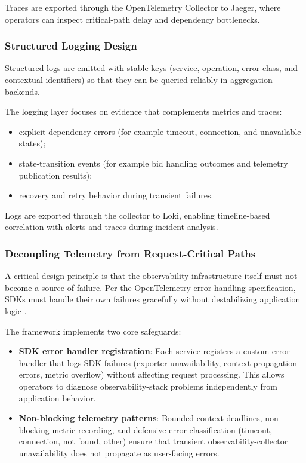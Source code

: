 Traces are exported through the OpenTelemetry Collector to Jaeger, where operators can inspect critical-path delay and dependency bottlenecks.

\subsubsection{Structured Logging Design}

Structured logs are emitted with stable keys (service, operation, error class, and contextual identifiers) so that they can be queried reliably in aggregation backends.

The logging layer focuses on evidence that complements metrics and traces:

\begin{itemize}
\item explicit dependency errors (for example timeout, connection, and unavailable states);
\item state-transition events (for example bid handling outcomes and telemetry publication results);
\item recovery and retry behavior during transient failures.
\end{itemize}

Logs are exported through the collector to Loki, enabling timeline-based correlation with alerts and traces during incident analysis.

\subsubsection{Decoupling Telemetry from Request-Critical Paths}

A critical design principle is that the observability infrastructure itself must not become a source of failure. Per the OpenTelemetry error-handling specification, SDKs must handle their own failures gracefully without destabilizing application logic \citep{opentelemetrySpecErrorHandling}.

The framework implements two core safeguards:

\begin{itemize}
	\item \textbf{SDK error handler registration}: Each service registers a custom error handler that logs SDK failures (exporter unavailability, context propagation errors, metric overflow) without affecting request processing. This allows operators to diagnose observability-stack problems independently from application behavior.
	\item \textbf{Non-blocking telemetry patterns}: Bounded context deadlines, non-blocking metric recording, and defensive error classification (timeout, connection, not found, other) ensure that transient observability-collector unavailability does not propagate as user-facing errors.
\end{itemize}

